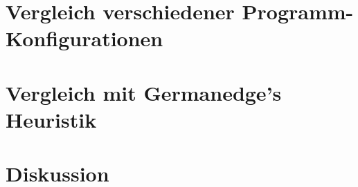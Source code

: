 \section{Vergleich verschiedener Programm-Konfigurationen}

\section{Vergleich mit Germanedge's Heuristik}

\section{Diskussion}

